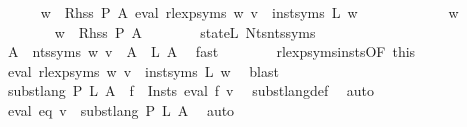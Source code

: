 \begin{isabellebody}
\ \ \ \ \isamarkupfalse%
\ {\isachardoublequoteopen}{\isasymforall}w\ {\isasymin}\ Rhss\ P\ A{\isachardot}{\kern0pt}\ eval\ {\isacharparenleft}{\kern0pt}rlexp{\isacharunderscore}{\kern0pt}syms\ w{\isacharparenright}{\kern0pt}\ v\ {\isacharequal}{\kern0pt}\ inst{\isacharunderscore}{\kern0pt}syms\ L\ w{\isachardoublequoteclose}\isanewline
\ \ \ \ \isamarkupfalse%
\isanewline
\ \ \ \ \ \ \isamarkupfalse%
\ w\isanewline
\ \ \ \ \ \ \isamarkupfalse%
\ {\isachardoublequoteopen}w\ {\isasymin}\ Rhss\ P\ A{\isachardoublequoteclose}\isanewline
\ \ \ \ \ \ \isamarkupfalse%
\ state{\isacharunderscore}{\kern0pt}L\ Nts{\isacharunderscore}{\kern0pt}nts{\isacharunderscore}{\kern0pt}syms\ \isamarkupfalse%
\ {\isachardoublequoteopen}{\isasymforall}A\ {\isasymin}\ nts{\isacharunderscore}{\kern0pt}syms\ w{\isachardot}{\kern0pt}\ v\ {\isacharparenleft}{\kern0pt}{\isasymgamma}{\isacharprime}{\kern0pt}\ A{\isacharparenright}{\kern0pt}\ {\isacharequal}{\kern0pt}\ L\ A{\isachardoublequoteclose}\ \isamarkupfalse%
\ fast\isanewline
\ \ \ \ \ \ \isamarkupfalse%
\ rlexp{\isacharunderscore}{\kern0pt}syms{\isacharunderscore}{\kern0pt}insts{\isacharbrackleft}{\kern0pt}OF\ this{\isacharbrackright}{\kern0pt}\ \isamarkupfalse%
\ {\isachardoublequoteopen}eval\ {\isacharparenleft}{\kern0pt}rlexp{\isacharunderscore}{\kern0pt}syms\ w{\isacharparenright}{\kern0pt}\ v\ {\isacharequal}{\kern0pt}\ inst{\isacharunderscore}{\kern0pt}syms\ L\ w{\isachardoublequoteclose}\ \isamarkupfalse%
\ blast\isanewline
\ \ \ \ \isamarkupfalse%
\isanewline
\ \ \ \ \isamarkupfalse%
\ \isamarkupfalse%
\ {\isachardoublequoteopen}subst{\isacharunderscore}{\kern0pt}lang\ P\ L\ A\ {\isacharequal}{\kern0pt}\ {\isacharparenleft}{\kern0pt}{\isasymUnion}f\ {\isasymin}\ {\isacharquery}{\kern0pt}Insts{\isachardot}{\kern0pt}\ eval\ f\ v{\isacharparenright}{\kern0pt}{\isachardoublequoteclose}\ \isamarkupfalse%
\ subst{\isacharunderscore}{\kern0pt}lang{\isacharunderscore}{\kern0pt}def\ \isamarkupfalse%
\ auto\isanewline
\ \ \ \ \isamarkupfalse%
\ {\isacharasterisk}{\kern0pt}\ \isamarkupfalse%
\ {\isachardoublequoteopen}eval\ eq\ v\ {\isacharequal}{\kern0pt}\ subst{\isacharunderscore}{\kern0pt}lang\ P\ L\ A{\isachardoublequoteclose}\ \isamarkupfalse%
\ auto\isanewline
\ \ \isamarkupfalse%

\end{isabellebody}
